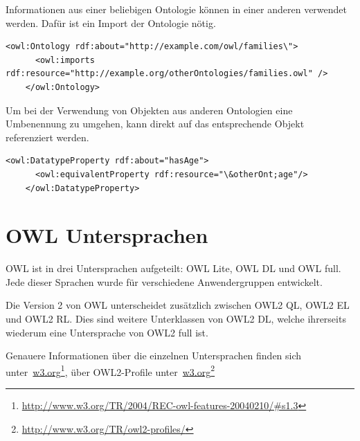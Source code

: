 Informationen aus einer beliebigen Ontologie können in einer anderen verwendet werden. Dafür ist ein Import der Ontologie nötig.

\begin{lstlisting}[caption={Beispiel eines Importes einer Ontologie}]
    <owl:Ontology rdf:about="http://example.com/owl/families\">
      <owl:imports rdf:resource="http://example.org/otherOntologies/families.owl" />
    </owl:Ontology>
\end{lstlisting}


Um bei der Verwendung von Objekten aus anderen Ontologien eine Umbenennung zu umgehen, kann direkt auf das entsprechende Objekt referenziert werden.

\begin{lstlisting}[caption={Beispiel einer Referenzierung auf ein Objekt einer externen Ontologie}]
    <owl:DatatypeProperty rdf:about="hasAge">
      <owl:equivalentProperty rdf:resource="\&otherOnt;age"/>
    </owl:DatatypeProperty>
\end{lstlisting}

\section{OWL Untersprachen}
\label{sec:owl_owl_Untersprachen}
OWL ist in drei Untersprachen aufgeteilt: OWL Lite, OWL DL und OWL full. Jede dieser Sprachen wurde für verschiedene Anwendergruppen entwickelt.

Die Version 2 von OWL unterscheidet zusätzlich zwischen OWL2 QL, OWL2 EL und OWL2 RL. Dies sind weitere Unterklassen von OWL2 DL, welche ihrerseits wiederum eine Untersprache von OWL2 full ist.

Genauere Informationen über die einzelnen Untersprachen finden sich unter~\href{http://www.w3.org/TR/2004/REC-owl-features-20040210/\#s1.3}{w3.org}\footnote{\url{http://www.w3.org/TR/2004/REC-owl-features-20040210/\#s1.3}}, über OWL2-Profile unter~\href{http://www.w3.org/TR/owl2-profiles/}{w3.org}\footnote{\url{http://www.w3.org/TR/owl2-profiles/}}


